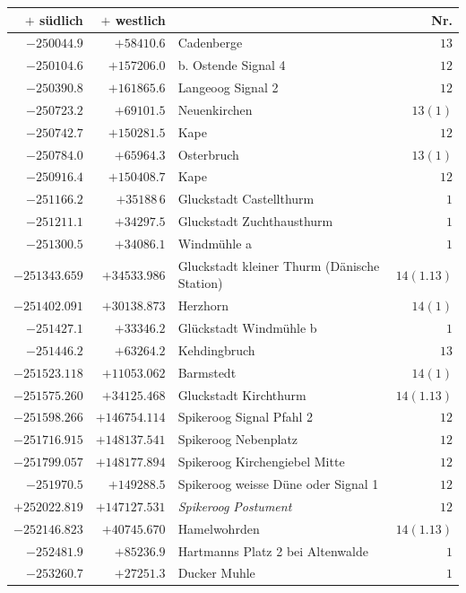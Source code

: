 \begin{center}\begingroup\fontsize{8}{9}\selectfont
\setlength{\tabcolsep}{4pt}
\begin{tabular}{r|r|p{170pt}|r}\hline
\(+\) südlich&\(+\) westlich&&Nr.\\\hline
\(-250044.9\)&\(+58410.6\)&Cadenberge&\(13\)\\
\(-250104.6\)&\(+157206.0\)&b. Ostende Signal 4&\(12\)\\
\(-250390.8\)&\(+161865.6\)&Langeoog Signal 2&\(12\)\\
\(-250723.2\)&\(+69101.5\)&Neuenkirchen&\(13(1)\)\\
\(-250742.7\)&\(+150281.5\)&Kape&\(12\)\\
\(-250784.0\)&\(+65964.3\)&Osterbruch&\(13(1)\)\\
\(-250916.4\)&\(+150408.7\)&Kape&\(12\)\\
\(-251166.2\)&\(+35188\,6\)&Gluckstadt Castellthurm&\(1\)\\
\(-251211.1\)&\(+34297.5\)&Gluckstadt Zuchthausthurm&\(1\)\\
\(-251300.5\)&\(+34086.1\)&Windmühle a&\(1\)\\
\(-251343.659\)&\(+34533.986\)&Gluckstadt kleiner Thurm (Dänische Station)&\(14(1.13)\)\\
\(-251402.091\)&\(+30138.873\)&Herzhorn&\(14(1)\)\\
\(-251427.1\)&\(+33346.2\)&Glückstadt Windmühle b&\(1\)\\
\(-251446.2\)&\(+63264.2\)&Kehdingbruch&\(13\)\\
\(-251523.118\)&\(+11053.062\)&Barmstedt&\(14(1)\)\\
\(-251575.260\)&\(+34125.468\)&Gluckstadt Kirchthurm&\(14(1.13)\)\\
\(-251598.266\)&\(+146754.114\)&Spikeroog Signal Pfahl 2&\(12\)\\
\(-251716.915\)&\(+148137.541\)&Spikeroog Nebenplatz&\(12\)\\
\(-251799.057\)&\(+148177.894\)&Spikeroog Kirchengiebel Mitte&\(12\)\\
\(-251970.5\)&\(+149288.5\)&Spikeroog weisse Düne oder Signal 1&\(12\)\\
\(+252022.819\)&\(+147127.531\)&\textit{Spikeroog Postument}&\(12\)\\
\(-252146.823\)&\(+40745.670\)&Hamelwohrden&\(14(1.13)\)\\
\(-252481.9\)&\(+85236.9\)&Hartmanns Platz 2 bei Altenwalde&\(1\)\\
\(-253260.7\)&\(+27251.3\)&Ducker Muhle&\(1\)\\

\end{tabular}
\end{center}
